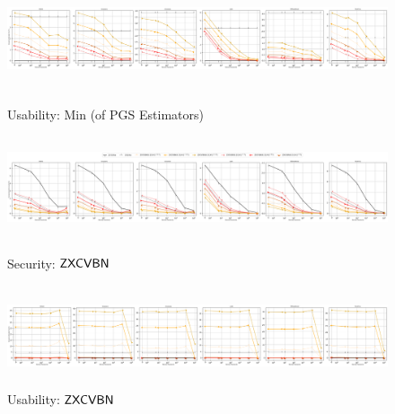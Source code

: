 \begin{figure}
	\includegraphics[width=\linewidth, height = 3cm]{Figures/Experiments/Utility/UsabilityMin}
	\vspace{-0.2in}
	\caption[Usability: Min]{Usability: Min (of PGS Estimators)}
	\label{fig:usabilitymin}
		\includegraphics[width=\linewidth, height = 3cm]{Figures/Experiments/Attacker/SecurityZxcvbn}
	\vspace{-0.2in}
	\caption[Security: $\ZXCVBN$ Estimator]{Security: $\ZXCVBN$}
	\label{fig:securityzxcvbn}
	\includegraphics[width=\linewidth, height = 3cm]{Figures/Experiments/Utility/UsabilityZxcvbn}
	\vspace{-0.2in}
	\caption[Security: $\ZXCVBN$ Estimator]{Usability: $\ZXCVBN$}
	\label{fig:usabilityzxcvbn}

\end{figure}




